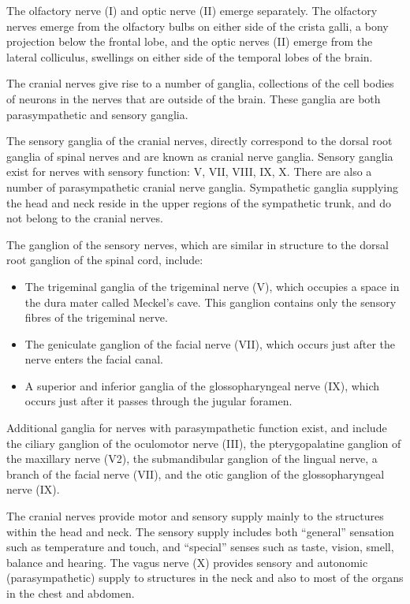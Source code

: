 The olfactory nerve (I) and optic nerve (II) emerge separately. The olfactory nerves emerge from the olfactory bulbs on either side of the crista galli, a bony projection below the frontal lobe, and the optic nerves (II) emerge from the lateral colliculus, swellings on either side of the temporal lobes of the brain.

The cranial nerves give rise to a number of ganglia, collections of the cell bodies of neurons in the nerves that are outside of the brain. These ganglia are both parasympathetic and sensory ganglia.

The sensory ganglia of the cranial nerves, directly correspond to the dorsal root ganglia of spinal nerves and are known as cranial nerve ganglia. Sensory ganglia exist for nerves with sensory function: V, VII, VIII, IX, X. There are also a number of parasympathetic cranial nerve ganglia. Sympathetic ganglia supplying the head and neck reside in the upper regions of the sympathetic trunk, and do not belong to the cranial nerves.

The ganglion of the sensory nerves, which are similar in structure to the dorsal root ganglion of the spinal cord, include:

\begin{itemize}
\tightlist
\item
  The trigeminal ganglia of the trigeminal nerve (V), which occupies a space in the dura mater called Meckel's cave. This ganglion contains only the sensory fibres of the trigeminal nerve.
\item
  The geniculate ganglion of the facial nerve (VII), which occurs just after the nerve enters the facial canal.
\item
  A superior and inferior ganglia of the glossopharyngeal nerve (IX), which occurs just after it passes through the jugular foramen.
\end{itemize}

Additional ganglia for nerves with parasympathetic function exist, and include the ciliary ganglion of the oculomotor nerve (III), the pterygopalatine ganglion of the maxillary nerve (V2), the submandibular ganglion of the lingual nerve, a branch of the facial nerve (VII), and the otic ganglion of the glossopharyngeal nerve (IX).

The cranial nerves provide motor and sensory supply mainly to the structures within the head and neck. The sensory supply includes both ``general'' sensation such as temperature and touch, and ``special'' senses such as taste, vision, smell, balance and hearing. The vagus nerve (X) provides sensory and autonomic (parasympathetic) supply to structures in the neck and also to most of the organs in the chest and abdomen.

